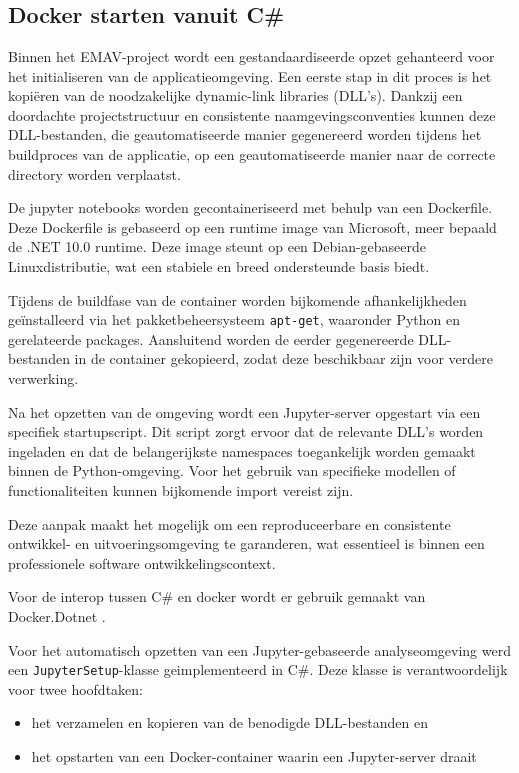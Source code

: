\chapter{}%
\label{ch:setup}

\section{{Docker starten vanuit C\#}}

Binnen het EMAV-project wordt een gestandaardiseerde opzet gehanteerd voor het 
initialiseren van de applicatieomgeving.
Een eerste stap in dit proces is het kopiëren van de noodzakelijke dynamic-link 
libraries (DLL's).
Dankzij een doordachte projectstructuur en consistente naamgevingsconventies 
kunnen deze DLL-bestanden,
die geautomatiseerde manier gegenereerd worden tijdens het buildproces 
van de applicatie,
op een geautomatiseerde manier naar de correcte directory worden verplaatst.

De jupyter notebooks worden gecontaineriseerd met behulp van een Dockerfile.
Deze Dockerfile is gebaseerd op een runtime image van Microsoft, 
meer bepaald de .NET 10.0 runtime.
Deze image steunt op een Debian-gebaseerde Linuxdistributie, 
wat een stabiele en breed ondersteunde basis biedt.

Tijdens de buildfase van de container worden bijkomende afhankelijkheden 
geïnstalleerd via het pakketbeheersysteem \texttt{apt-get},
waaronder Python en gerelateerde packages.
Aansluitend worden de eerder gegenereerde DLL-bestanden in de container 
gekopieerd, zodat deze beschikbaar zijn voor verdere verwerking.

Na het opzetten van de omgeving wordt een Jupyter-server opgestart via een 
specifiek startupscript.
Dit script zorgt ervoor dat de relevante DLL's worden ingeladen 
en dat de belangerijkste namespaces toegankelijk worden gemaakt binnen de Python-omgeving.
Voor het gebruik van specifieke modellen of functionaliteiten kunnen bijkomende import vereist zijn.

Deze aanpak maakt het mogelijk om een reproduceerbare en consistente ontwikkel- 
en uitvoeringsomgeving te garanderen, wat essentieel is binnen een 
professionele software ontwikkelingscontext.


Voor de interop tussen C\# en docker wordt er gebruik gemaakt van Docker.Dotnet \textcite{docker_dotnet}.

Voor het automatisch opzetten van een Jupyter-gebaseerde 
analyseomgeving werd een \texttt{JupyterSetup}-klasse geimplementeerd in C\#.
Deze klasse is verantwoordelijk voor twee hoofdtaken:
\begin{itemize}
	\item het verzamelen en kopieren van de benodigde DLL-bestanden en
	\item het opstarten van een Docker-container waarin een Jupyter-server draait
\end{itemize}

